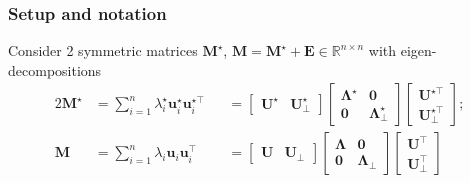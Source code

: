 \documentclass[compress,
mathserif,wide,%
]{beamer}
\begin{document}
\begin{frame}
\frametitle{Setup and notation}
	\label{frame:setup-spectral}

Consider 2 symmetric matrices $\bm{M}^{\star}$, $\bm{M}=\bm{M}^{\star}+\bm{E}\in \mathbb{R}^{n\times n}$ with  eigen-decompositions 
\begin{alignat*}{2}
\bm{M}^{\star} & =\sum_{i=1}^{n}\lambda_{i}^{\star}\bm{u}_{i}^{\star}\bm{u}_{i}^{\star\top} & & =\left[\begin{array}{cc}
\bm{U}^{\star} & \bm{U}_{\perp}^{\star}\end{array}\right]\left[\begin{array}{cc}
\bm{\Lambda}^{\star} & \bm{0}\\
\bm{0} & \bm{\Lambda}_{\perp}^{\star}
\end{array}\right]\left[\begin{array}{c}
\bm{U}^{\star\top}\\
\bm{U}_{\perp}^{\star\top}
\end{array}\right];   \\
\bm{M} & =\sum_{i=1}^{n}\lambda_{i}\bm{u}_{i}\bm{u}_{i}^{\top} & & =\left[\begin{array}{cc}
\bm{U} & \bm{U}_{\perp}\end{array}\right]\left[\begin{array}{cc}
\bm{\Lambda} & \bm{0}\\
\bm{0} & \bm{\Lambda}_{\perp}
\end{array}\right]\left[\begin{array}{c}
\bm{U}^{\top}\\
\bm{U}_{\perp}^{\top}
\end{array}\right]
\end{alignat*}

\end{frame}
\end{document}
